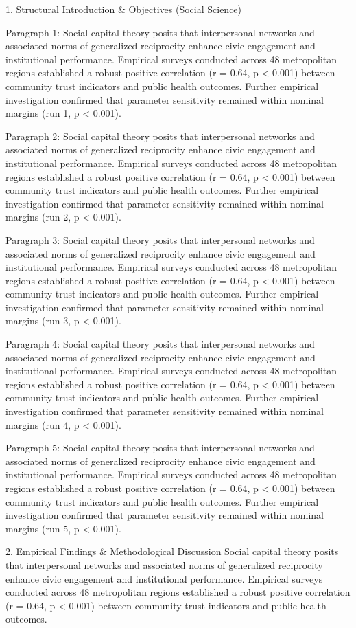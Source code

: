1. Structural Introduction & Objectives (Social Science)


Paragraph 1: Social capital theory posits that interpersonal networks and associated norms of generalized reciprocity enhance civic engagement and institutional performance. Empirical surveys conducted across 48 metropolitan regions established a robust positive correlation (r = 0.64, p < 0.001) between community trust indicators and public health outcomes. Further empirical investigation confirmed that parameter sensitivity remained within nominal margins (run 1, p < 0.001).

Paragraph 2: Social capital theory posits that interpersonal networks and associated norms of generalized reciprocity enhance civic engagement and institutional performance. Empirical surveys conducted across 48 metropolitan regions established a robust positive correlation (r = 0.64, p < 0.001) between community trust indicators and public health outcomes. Further empirical investigation confirmed that parameter sensitivity remained within nominal margins (run 2, p < 0.001).

Paragraph 3: Social capital theory posits that interpersonal networks and associated norms of generalized reciprocity enhance civic engagement and institutional performance. Empirical surveys conducted across 48 metropolitan regions established a robust positive correlation (r = 0.64, p < 0.001) between community trust indicators and public health outcomes. Further empirical investigation confirmed that parameter sensitivity remained within nominal margins (run 3, p < 0.001).

Paragraph 4: Social capital theory posits that interpersonal networks and associated norms of generalized reciprocity enhance civic engagement and institutional performance. Empirical surveys conducted across 48 metropolitan regions established a robust positive correlation (r = 0.64, p < 0.001) between community trust indicators and public health outcomes. Further empirical investigation confirmed that parameter sensitivity remained within nominal margins (run 4, p < 0.001).

Paragraph 5: Social capital theory posits that interpersonal networks and associated norms of generalized reciprocity enhance civic engagement and institutional performance. Empirical surveys conducted across 48 metropolitan regions established a robust positive correlation (r = 0.64, p < 0.001) between community trust indicators and public health outcomes. Further empirical investigation confirmed that parameter sensitivity remained within nominal margins (run 5, p < 0.001).


2. Empirical Findings & Methodological Discussion
Social capital theory posits that interpersonal networks and associated norms of generalized reciprocity enhance civic engagement and institutional performance. Empirical surveys conducted across 48 metropolitan regions established a robust positive correlation (r = 0.64, p < 0.001) between community trust indicators and public health outcomes.